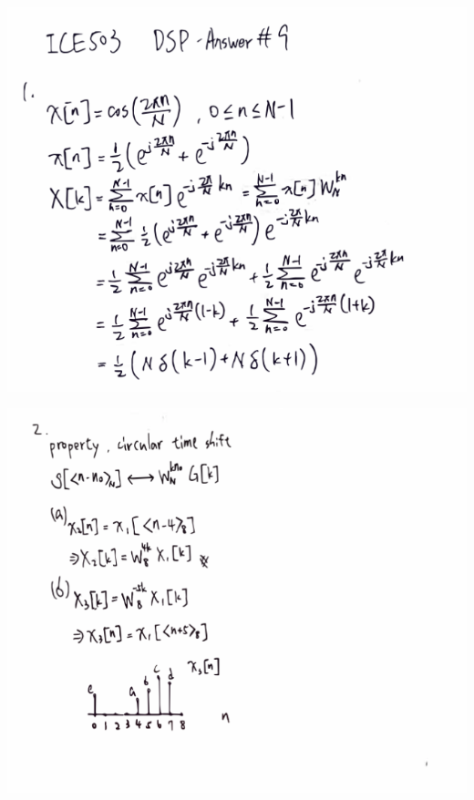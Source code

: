 \documentclass[a4paper]{article}
\begin{document}
	\begin{center}
		\includegraphics[width=1\linewidth]{screenshot093}
	\end{center}
	\begin{center}
		\includegraphics[width=1\linewidth]{screenshot094}
	\end{center}
	
\end{document}
